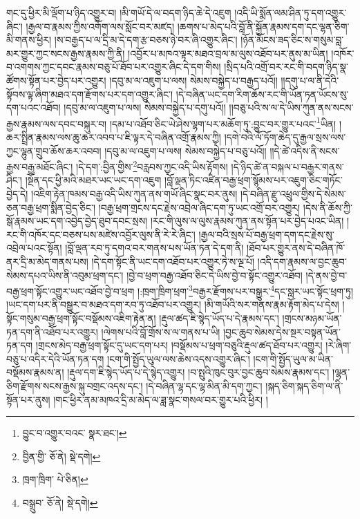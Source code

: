 གང་དུ་ཕྱིར་མི་ལྡོག་པ་ཉིད་འགྱུར་བ། །མི་གཡོ་དེ་ལ་བདག་ཉིད་ཆེ་དེ་འཇུག །འདི་ཡི་སྨོན་ལམ་ཤིན་ཏུ་དག་འགྱུར་ཞིང་། །རྒྱལ་བ་རྣམས་ཀྱིས་འགོག་ལས་སློང་བར་མཛད། །ཆགས་པ་མེད་པའི་བློ་ནི་སྐྱོན་རྣམས་དག་དང་ལྷན་ཅིག་མི་གནས་ཕྱིར། །ས་བརྒྱད་པ་ལ་དྲི་མ་དེ་དག་རྩ་བཅས་ཉེ་བར་ཞི་འགྱུར་ཞིང་། །ཉོན་མོངས་ཟད་ཅིང་ས་གསུམ་བླ་མར་གྱུར་ཀྱང་སངས་རྒྱས་རྣམས་ཀྱི་ནི། །འབྱོར་པ་མཁའ་ལྟར་མཐའ་བྲལ་མ་ལུས་འཐོབ་པར་ནུས་མ་ཡིན། །འཁོར་བ་འགགས་ཀྱང་དབང་རྣམས་བཅུ་པོ་ཐོབ་པར་འགྱུར་ཞིང་དེ་དག་གིས། །སྲིད་པའི་འགྲོ་བར་རང་གི་བདག་ཉིད་སྣ་ཚོགས་སྟོན་པར་བྱེད་པར་འགྱུར། །དབུ་མ་ལ་འཇུག་པ་ལས། སེམས་བསྐྱེད་པ་བརྒྱད་པའོ།། །།དགུ་པ་ལ་ནི་དེའི་སྟོབས་ལྟ་ཞིག་མཐའ་དག་རྫོགས་པར་དག་འགྱུར་ཞིང་། །དེ་བཞིན་ཡང་དག་རིག་ཆོས་རང་གི་ཡོན་ཏན་ཡོངས་སུ་དག་པའང་འཐོབ། །དབུ་མ་ལ་འཇུག་པ་ལས། སེམས་བསྐྱེད་པ་དགུ་པའོ།། །།བཅུ་པའི་ས་ལ་དེ་ཡིས་ཀུན་ནས་སངས་རྒྱས་རྣམས་ལས་དབང་བསྐུར་བ། །དམ་པ་འཐོབ་ཅིང་ཡེ་ཤེས་ལྷག་པར་མཆོག་ཏུ་:བྱུང་བར་གྱུར་པའང་\footnote{བྱུང་བ་འགྱུར་བའང་  སྣར་ཐང་། }ཡིན། །ཆར་སྤྲིན་རྣམས་ལས་ཆུ་ཆར་འབབ་པ་ཇི་ལྟར་དེ་བཞིན་འགྲོ་རྣམས་ཀྱི། །དགེ་བའི་ལོ་ཏོག་ཆེད་དུ་རྒྱལ་སྲས་ལས་ཀྱང་ལྷུན་གྲུབ་ཆོས་ཆར་འབབ། །དབུ་མ་ལ་འཇུག་པ་ལས། སེམས་བསྐྱེད་པ་བཅུ་པའོ།། །།དེ་ཚེ་འདིས་ནི་སངས་རྒྱས་བརྒྱ་མཐོང་ཞིང་། །དེ་དག་:བྱིན་གྱིས་\footnote{བྱིན་གྱི་  ཅོ་ནེ།  སྡེ་དགེ། }བརླབས་ཀྱང་འདི་ཡིས་རྟོགས། །དེ་ཉིད་ཚེ་ན་བསྐལ་པ་བརྒྱར་གནས་ཤིང་། །སྔོན་དང་ཕྱི་མའི་མཐར་ཡང་ཡང་དག་འཇུག །བློ་ལྡན་ཏིང་འཛིན་བརྒྱ་ཕྲག་སྙོམས་པར་འཇུག་ཅིང་གཏོང་བྱེད་དེ། །འཇིག་རྟེན་ཁམས་བརྒྱ་འདི་ཡིས་ཀུན་ནས་གཡོ་ཞིང་སྣང་བར་ནུས། །དེ་བཞིན་རྫུ་འཕྲུལ་གྱིས་དེ་སེམས་ཅན་བརྒྱ་ཕྲག་སྨིན་བྱེད་ཅིང་། །བརྒྱ་ཕྲག་གྲངས་དང་རྗེས་འབྲེལ་ཞིང་དག་ཏུ་ཡང་འགྲོ་བར་འགྱུར། །དེས་ནི་ཆོས་ཀྱི་སྒོ་རྣམས་ཡང་དག་འབྱེད་བྱེད་ཐུབ་དབང་སྲས། །རང་གི་ལུས་ལ་ལུས་རྣམས་ཀུན་ནས་སྟོན་པར་བྱེད་པའང་ཡིན། །རང་གི་འཁོར་དང་བཅས་པས་མཛེས་འབྱོར་ལུས་ནི་རེ་རེ་ཞིང་། །རྒྱལ་བའི་སྲས་པོ་བརྒྱ་ཕྲག་དག་དང་རྗེས་སུ་འབྲེལ་པའང་སྟོན། །བློ་ལྡན་རབ་ཏུ་དགའ་བར་གནས་པས་ཡོན་ཏན་དེ་དག་ནི། །ཐོབ་པར་གྱུར་ནས་དེ་བཞིན་ཁོ་ནར་དྲི་མ་མེད་གནས་པས། །དེ་དག་སྟོང་ནི་ཡང་དག་འཐོབ་པར་འགྱུར་ཏེ་ས་ལྔ་པོ། །འདི་དག་རྣམས་ལ་བྱང་ཆུབ་སེམས་དཔའ་ཡིས་ནི་འབུམ་ཕྲག་དང་། །བྱེ་བ་ཕྲག་བརྒྱ་འཐོབ་ཅིང་དེ་ཡིས་བྱེ་བ་སྟོང་འགྱུར་འཐོབ། །དེ་ནས་བྱེ་བ་བརྒྱ་ཕྲག་སྟོང་འགྱུར་ཡང་འཐོབ་བྱེ་བ་ཕྲག །:ཁྲག་ཁྲིག་ཕྲག་\footnote{ཁྲག་ཁྲིག་  པེ་ཅིན། }བརྒྱར་རྫོགས་པར་བསྒྱུར་\footnote{བསྒྲུབ་  ཅོ་ནེ།  སྡེ་དགེ། }དང་སླར་ཡང་སྟོང་ཕྲག་ཏུ། །ཡང་དག་པར་ནི་བསྒྱུར་བ་མཐའ་དག་རབ་ཏུ་འཐོབ་པར་འགྱུར། །མི་གཡོའི་སར་གནས་རྣམ་རྟོག་མེད་པ་དེས། །སྟོང་གསུམ་བརྒྱ་ཕྲག་སྟོང་བསྡོམས་འཇིག་རྟེན་ན། །རྡུལ་ཚད་ཇི་སྙེད་ཡོད་པ་དེ་རྣམས་དང་། །གྲངས་མཉམ་ཡོན་ཏན་དག་ནི་འཐོབ་པར་འགྱུར། །ལེགས་པའི་བློ་གྲོས་ས་ལ་གནས་པ་ཡི། །བྱང་ཆུབ་སེམས་དེས་སྔར་བསྟན་ཡོན་ཏན་དག །གྲངས་མེད་བརྒྱ་ཕྲག་སྟོང་དུ་ཡང་དག་པར། །བསྡོམས་པ་ཕྲག་བཅུའི་རྡུལ་ཚད་ཐོབ་པར་འགྱུར། །རེ་ཞིག་བཅུ་པ་འདིར་དེའི་ཡོན་ཏན་དག །ངག་གི་སྤྱོད་ཡུལ་ལས་ཆེས་འདས་འགྱུར་ཞིང་། །ངག་གི་སྤྱོད་ཡུལ་མ་ཡིན་བསྡོམས་རྣམས་ན། །རྡུལ་དག་ཇི་སྙེད་ཡོད་པ་དེ་སྙེད་འགྱུར། །བ་སྤུའི་ཁུང་བུར་བྱང་ཆུབ་སེམས་རྣམས་དང་། །ལྷན་ཅིག་རྫོགས་སངས་རྒྱས་སྐུ་བགྲང་འདས་དང་། །དེ་བཞིན་ལྷ་དང་ལྷ་མིན་མི་དག་ཀྱང་། །སྐད་ཅིག་སྐད་ཅིག་ལ་ནི་སྟོན་པར་ནུས། །གང་ཕྱིར་ནམ་མཁའ་དྲི་མ་མེད་ལ་ཟླ་སྣང་གསལ་བར་གྱུར་པའི་ཕྱིར། །
